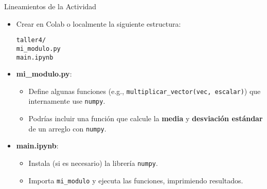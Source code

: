 \documentclass[10pt]{beamer}
\begin{document}
\begin{frame}{Lineamientos de la Actividad}
  \begin{itemize}
    \item Crear en Colab o localmente la siguiente estructura:
    
      \texttt{taller4/}\\
      \quad \texttt{mi\_modulo.py}\\
      \quad \texttt{main.ipynb} \quad {}\\
    
    \item \textbf{mi\_modulo.py}:
      \begin{itemize}
        \item Define algunas funciones (e.g., \texttt{multiplicar\_vector(vec, escalar)}) que internamente use \texttt{numpy}.
        \item Podrías incluir una función que calcule la \textbf{media} y \textbf{desviación estándar} de un arreglo con \texttt{numpy}.
      \end{itemize}
    \item \textbf{main.ipynb}:
      \begin{itemize}
        \item Instala (si es necesario) la librería \texttt{numpy}.
        \item Importa \texttt{mi\_modulo} y ejecuta las funciones, imprimiendo resultados.
      \end{itemize}
  \end{itemize}
\end{frame}
\end{document}

